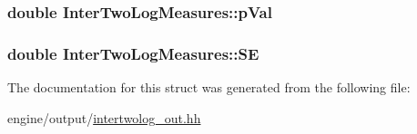 \label{structInterTwoLogMeasures_ae2674bca1f6256b7ffee69a6753223fa}
\hypertarget{structInterTwoLogMeasures_acc51a0307cefa7e90cac00b59e73c492}{
\subsubsection[{pVal}]{\setlength{\rightskip}{0pt plus 5cm}double {\bf InterTwoLogMeasures::pVal}}}
\label{structInterTwoLogMeasures_acc51a0307cefa7e90cac00b59e73c492}
\hypertarget{structInterTwoLogMeasures_a30ea64299ac79791bf47cda86b350fdd}{
\subsubsection[{SE}]{\setlength{\rightskip}{0pt plus 5cm}double {\bf InterTwoLogMeasures::SE}}}
\label{structInterTwoLogMeasures_a30ea64299ac79791bf47cda86b350fdd}


The documentation for this struct was generated from the following file:\begin{DoxyCompactItemize}
\item 
engine/output/\hyperlink{intertwolog__out_8hh}{intertwolog\_\-out.hh}\end{DoxyCompactItemize}
